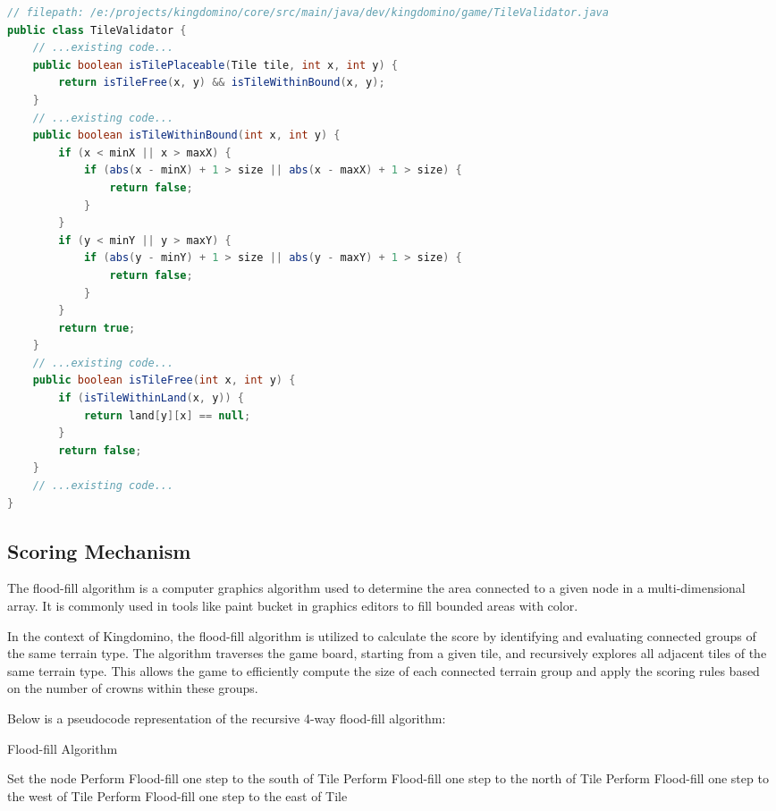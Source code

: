 \documentclass[conference]{IEEEtran}
\begin{document}
\begin{lstlisting}[language=Java]
// filepath: /e:/projects/kingdomino/core/src/main/java/dev/kingdomino/game/TileValidator.java
public class TileValidator {
    // ...existing code...
    public boolean isTilePlaceable(Tile tile, int x, int y) {
        return isTileFree(x, y) && isTileWithinBound(x, y);
    }
    // ...existing code...
    public boolean isTileWithinBound(int x, int y) {
        if (x < minX || x > maxX) {
            if (abs(x - minX) + 1 > size || abs(x - maxX) + 1 > size) {
                return false;
            }
        }
        if (y < minY || y > maxY) {
            if (abs(y - minY) + 1 > size || abs(y - maxY) + 1 > size) {
                return false;
            }
        }
        return true;
    }
    // ...existing code...
    public boolean isTileFree(int x, int y) {
        if (isTileWithinLand(x, y)) {
            return land[y][x] == null;
        }
        return false;
    }
    // ...existing code...
}
\end{lstlisting}

\subsection{Scoring Mechanism}

The flood-fill algorithm is a computer graphics algorithm used to determine the
area connected to a given node in a multi-dimensional array. It is commonly
used in tools like paint bucket in graphics editors to fill bounded areas with
color.

In the context of Kingdomino, the flood-fill algorithm is utilized to calculate
the score by identifying and evaluating connected groups of the same terrain
type. The algorithm traverses the game board, starting from a given tile, and
recursively explores all adjacent tiles of the same terrain type. This allows
the game to efficiently compute the size of each connected terrain group and
apply the scoring rules based on the number of crowns within these groups.

Below is a pseudocode representation of the recursive 4-way flood-fill
algorithm:

\begin{algorithm}[htbp]
    \caption{Flood-fill Algorithm}
    Set the node\;
    Perform Flood-fill one step to the south of Tile\;
    Perform Flood-fill one step to the north of Tile\;
    Perform Flood-fill one step to the west of Tile\;
    Perform Flood-fill one step to the east of Tile\;
    \Return\;
\end{algorithm}
\end{document}
